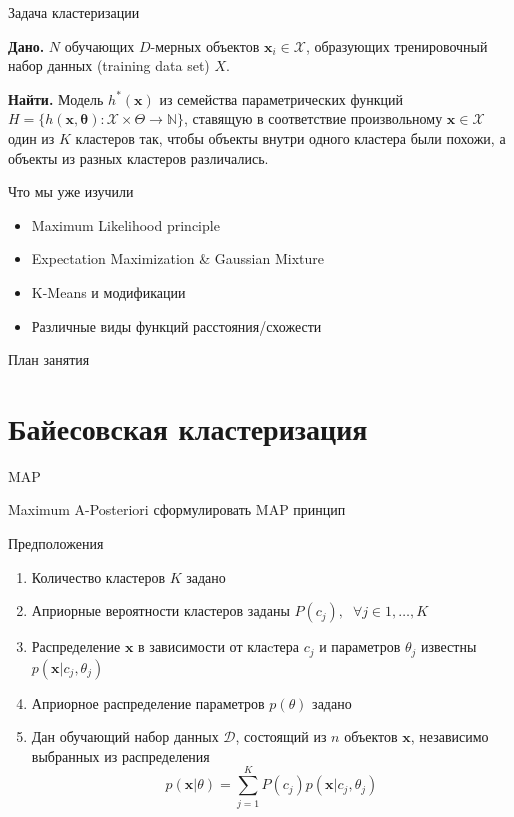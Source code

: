 \documentclass[10pt]{beamer}
\begin{document}
\begin{frame}{Задача кластеризации}

{\bf Дано.} $N$ обучающих $D$-мерных объектов $\mathbf{x}_i \in \mathcal{X}$, образующих тренировочный набор данных (training data set) $X$.

\vspace{1em}
{\bf Найти.} Модель $h^*(\mathbf{x})$ из семейства параметрических функций $H = \{h(\mathbf{x, \mathbf{\theta}}): \mathcal{X} \times \Theta \rightarrow \mathbb{N}\}$, ставящую в соответствие произвольному $\mathbf{x} \in \mathcal{X}$ один из $K$ кластеров так, чтобы объекты внутри одного кластера были похожи, а объекты из разных кластеров различались.

\vspace{1em}
Что мы уже изучили
\begin{itemize}
\item Maximum Likelihood principle
\item Expectation Maximization \& Gaussian Mixture
\item K-Means и модификации
\item Различные виды функций расстояния/схожести
\end{itemize}

\end{frame}

\begin{frame}{План занятия}
\tableofcontents
\end{frame}


\section{Байесовская кластеризация}


\begin{frame}{MAP}

\begin{block}{Maximum A-Posteriori}
сформулировать MAP принцип
\end{block}

\vspace{1em}
Предположения
\begin{enumerate}
\item Количество кластеров $K$ задано
\item Априорные вероятности кластеров заданы $P(c_j), \;\; \forall j \in 1,\ldots,K$
\item Распределение $\mathbf{x}$ в зависимости от клаcтера $c_j$ и параметров $\theta_j$ известны $p(\mathbf{x} | c_j, \theta_j)$
\item Априорное распределение параметров $p(\theta)$ задано
\item Дан обучающий набор данных $\mathcal{D}$, состоящий из $n$ объектов $\mathbf{x}$, независимо выбранных из распределения
\[
p(\mathbf{x} | \theta) = \sum_{j=1}^K P(c_j) p(\mathbf{x} | c_j, \theta_j)
\]
\end{enumerate}

\end{frame}
\end{document}
